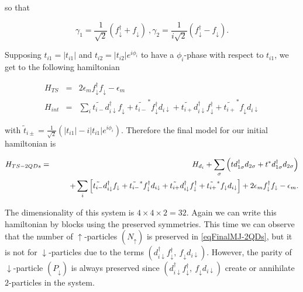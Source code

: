 so that 

\[
\gamma_{1}=\frac{1}{\sqrt{2}}\left(f_{\downarrow}^{\dagger}+f_{\downarrow}\right)\ ,\gamma_{2}=\frac{1}{i\sqrt{2}}\left(f_{\downarrow}^{\dagger}-f_{\downarrow}\right).
\]


Supposing $t_{i1}=\left|t_{i1}\right|$ and $t_{i2}=\left|t_{i2}\right|e^{i\phi_{i}}$
to have a $\phi_{i}$-phase with respect to $t_{i1}$, we get to the
following hamiltonian 

\begin{eqnarray*}
H_{TS} & = & 2\epsilon_{m}f_{\downarrow}^{\dagger}f_{\downarrow}-\epsilon_{m}\\
H_{int} & = & \sum_{i}\tilde{t_{i-}}d_{i\downarrow}^{\dagger}f_{\downarrow}+\tilde{t_{i-}}^{*}f_{\downarrow}^{\dagger}d_{i\downarrow}+\tilde{t_{i+}}d_{i\downarrow}^{\dagger}f_{\downarrow}^{\dagger}+\tilde{t_{i+}}^{*}f_{\downarrow}d_{i\downarrow}
\end{eqnarray*}


with $\tilde{t}_{i\pm}=\frac{1}{\sqrt{2}}\left(\left|t_{i1}\right|-i\left|t_{i1}\right|e^{i\phi_{i}}\right).$
Therefore the final model for our initial hamiltonian is 

\begin{eqnarray}
H_{TS-2QDs} & = & H_{d_{i}}+\sum_{\sigma}\left(td_{1\sigma}^{\dagger}d_{2\sigma}+t^{*}d_{1\sigma}^{\dagger}d_{2\sigma}\right)\nonumber \\
 &  & \ \enskip\ \enskip+\sum_{i}\left[\tilde{t_{i-}}d_{i\downarrow}^{\dagger}f_{\downarrow}+\tilde{t_{i-}}^{*}f_{\downarrow}^{\dagger}d_{i\downarrow}+\tilde{t_{i+}}d_{i\downarrow}^{\dagger}f_{\downarrow}^{\dagger}+\tilde{t_{i+}}^{*}f_{\downarrow}d_{i\downarrow}\right]+2\epsilon_{m}f_{\downarrow}^{\dagger}f_{\downarrow}-\epsilon_{m}.\label{eqFinalMJ-2QDs}
\end{eqnarray}


The dimensionality of this system is $4\times4\times2=32.$ Again
we can write this hamiltonian by blocks using the preserved symmetries.
This time we can observe that the number of $\uparrow$-particles
$\left(N_{\uparrow}\right)$ is preserved in \ref{eqFinalMJ-2QDs},
but it is not for $\downarrow$-particles due to the terms $\left(d_{i\downarrow}^{\dagger}f_{\downarrow}^{\dagger},\ f_{\downarrow}d_{i\downarrow}\right)$.
However, the parity of $\downarrow$-particle $\left(P_{\downarrow}\right)$
is always preserved since $\left(d_{i\downarrow}^{\dagger}f_{\downarrow}^{\dagger},\ f_{\downarrow}d_{i\downarrow}\right)$
create or annihilate $2$-particles in the system. 

